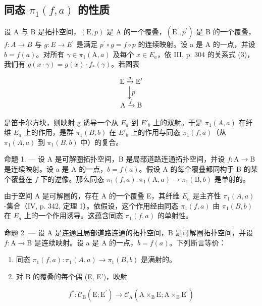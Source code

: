 \subsection{\texorpdfstring{同态 \(\pi_{1}(f,a)\) 的性质}{同态 pi\_1(f,a) 的性质}}

设 A 与 B 是拓扑空间，\((\mathrm{E},p)\) 是 A 的一个覆叠，\((\mathrm{E}^{\prime},p^{\prime})\) 是 B 的一个覆叠，\(f\colon A\to B\) 与 \(g\colon E\to E^{\prime}\) 是满足 \(p^{\prime}\circ g=f\circ p\) 的连续映射。设 a 是 A 的一点，并设 \(b=f(a)\)。对所有 \(\gamma\in\pi_{1}(\mathrm{A},a)\) 及每个 \(x\in E_{a}\)，依 III, p. 304 的关系式 (3)，我们有 \(g(x\cdot\gamma)=g(x)\cdot f_{*}(\gamma)\)。若图表

\[
\begin{array}{c} \mathrm{E} \xrightarrow {g} \mathrm{E} ^ {\prime} \\ \Big \downarrow p \\ \mathrm{A} \xrightarrow {f} \mathrm{B} \end{array}
\]

是笛卡尔方块，则映射 g 诱导一个从 \(E_{a}\) 到 \(E'_{b}\) 上的双射。于是 \(\pi_{1}(A,a)\) 在纤维 \(E_{a}\) 上的作用，是群 \(\pi_{1}(B,b)\) 在 \(E'_{b}\) 上的作用与同态 \(\pi_{1}(f,a)\)（从 \(\pi_{1}(A,a)\) 到 \(\pi_{1}(B,b)\) 中）的复合。

命题 1. --- 设 A 是可解圈拓扑空间，B 是局部道路连通拓扑空间，并设 \(f\colon\mathrm{A}\to\mathrm{B}\) 是连续映射。设 a 是 A 的一点，\(b=f(a)\)。假设 A 的每个覆叠都同构于 B 的某个覆叠在 \(f\) 下的逆像。那么同态 \(\pi_{1}(f,a)\colon\pi_{1}(\mathrm{A},a)\to\pi_{1}(\mathrm{B},b)\) 是单射的。

由于空间 A 是可解圈的，存在 A 的一个覆叠 E，其纤维 \(E_{a}\) 是主齐性 \(\pi_{1}(A,a)\) -集合（IV, p. 342, 定理 1）。依假设，这个作用经由同态 \(\pi_{1}(f,a)\) 由 \(\pi_{1}(B,b)\) 在 \(E_{a}\) 上的一个作用诱导。这蕴含同态 \(\pi_{1}(f,a)\) 的单射性。

命题 2. --- 设 A 是连通且局部道路连通的拓扑空间，B 是可解圈拓扑空间，并设 \(f\colon\mathrm{A}\to\mathrm{B}\) 是连续映射。设 a 是 A 的一点，\(b=f(a)\)。下列断言等价：

\begin{enumerate}
\def\labelenumi{(\roman{enumi})}
\item
  同态 \(\pi_1(f,a)\colon \pi_1(A,a)\to \pi_1(B,b)\) 是满射的。
\item
  对 B 的覆叠的每个偶 (E, E')，映射
\end{enumerate}

\[
f ^ {*} \colon \mathscr {C} _ {\mathrm{B}} (\mathrm{E}; \mathrm{E} ^ {\prime}) \rightarrow \mathscr {C} _ {\mathrm{A}} (\mathrm{A} \times_ {\mathrm{B}} \mathrm{E}; \mathrm{A} \times_ {\mathrm{B}} \mathrm{E} ^ {\prime})
\]

